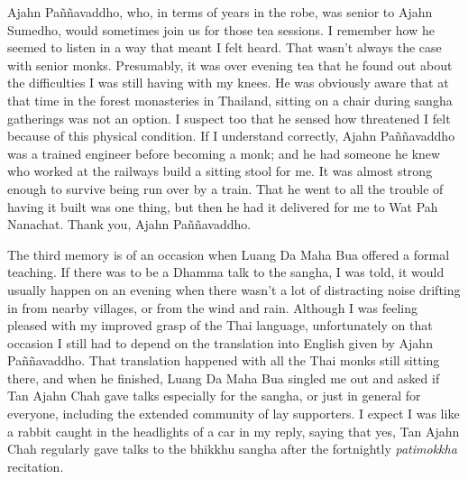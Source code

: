Ajahn Paññavaddho, who, in terms of years in the robe, was senior to
Ajahn Sumedho, would sometimes join us for those tea sessions. I
remember how he seemed to listen in a way that meant I felt heard. That
wasn't always the case with senior monks. Presumably, it was over
evening tea that he found out about the difficulties I was still having
with my knees. He was obviously aware that at that time in the forest
monasteries in Thailand, sitting on a chair during sangha gatherings was
not an option. I suspect too that he sensed how threatened I felt
because of this physical condition. If I understand correctly, Ajahn
Paññavaddho was a trained engineer before becoming a monk; and he had
someone he knew who worked at the railways build a sitting stool for me.
It was almost strong enough to survive being run over by a train. That
he went to all the trouble of having it built was one thing, but then he
had it delivered for me to Wat Pah Nanachat. Thank you, Ajahn
Paññavaddho.

The third memory is of an occasion when Luang Da Maha Bua offered a
formal teaching. If there was to be a Dhamma talk to the sangha, I was
told, it would usually happen on an evening when there wasn't a lot of
distracting noise drifting in from nearby villages, or from the wind and
rain. Although I was feeling pleased with my improved grasp of the Thai
language, unfortunately on that occasion I still had to depend on the
translation into English given by Ajahn Paññavaddho. That translation
happened with all the Thai monks still sitting there, and when he
finished, Luang Da Maha Bua singled me out and asked if Tan Ajahn Chah
gave talks especially for the sangha, or just in general for everyone,
including the extended community of lay supporters. I expect I was like
a rabbit caught in the headlights of a car in my reply, saying that yes,
Tan Ajahn Chah regularly gave talks to the bhikkhu sangha after the
fortnightly \emph{patimokkha} recitation.

